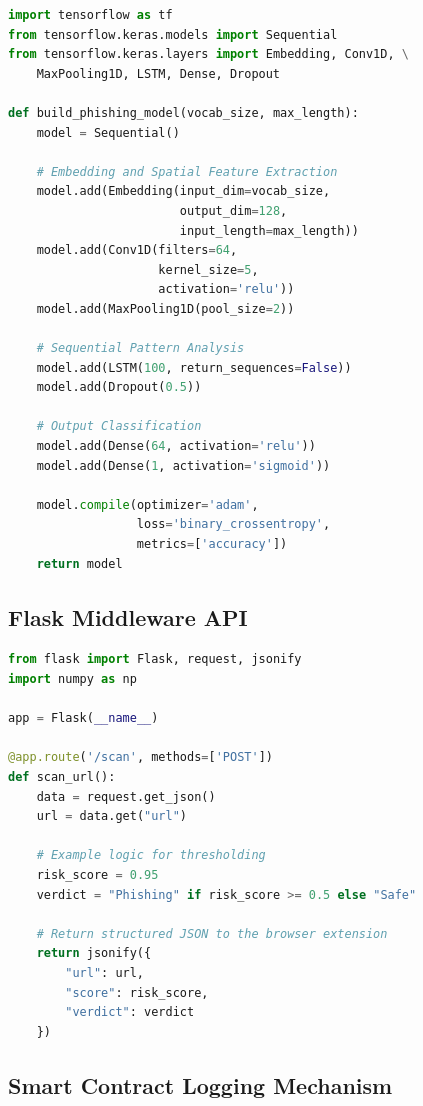 \begin{lstlisting}[language=Python, caption={Hybrid CNN-LSTM Definition using Keras}, label={code:ai_model}]
import tensorflow as tf
from tensorflow.keras.models import Sequential
from tensorflow.keras.layers import Embedding, Conv1D, \
    MaxPooling1D, LSTM, Dense, Dropout

def build_phishing_model(vocab_size, max_length):
    model = Sequential()
    
    # Embedding and Spatial Feature Extraction
    model.add(Embedding(input_dim=vocab_size, 
                        output_dim=128, 
                        input_length=max_length))
    model.add(Conv1D(filters=64, 
                     kernel_size=5, 
                     activation='relu'))
    model.add(MaxPooling1D(pool_size=2))
    
    # Sequential Pattern Analysis
    model.add(LSTM(100, return_sequences=False))
    model.add(Dropout(0.5))
    
    # Output Classification
    model.add(Dense(64, activation='relu'))
    model.add(Dense(1, activation='sigmoid'))
    
    model.compile(optimizer='adam', 
                  loss='binary_crossentropy', 
                  metrics=['accuracy'])
    return model
\end{lstlisting}

\subsection{Flask Middleware API}

\begin{lstlisting}[language=Python, caption={Flask Middleware API}, label={code:api_route}]
from flask import Flask, request, jsonify
import numpy as np

app = Flask(__name__)

@app.route('/scan', methods=['POST'])
def scan_url():
    data = request.get_json()
    url = data.get("url")
    
    # Example logic for thresholding
    risk_score = 0.95 
    verdict = "Phishing" if risk_score >= 0.5 else "Safe"

    # Return structured JSON to the browser extension
    return jsonify({
        "url": url, 
        "score": risk_score, 
        "verdict": verdict
    })
\end{lstlisting}

\subsection{Smart Contract Logging Mechanism}


